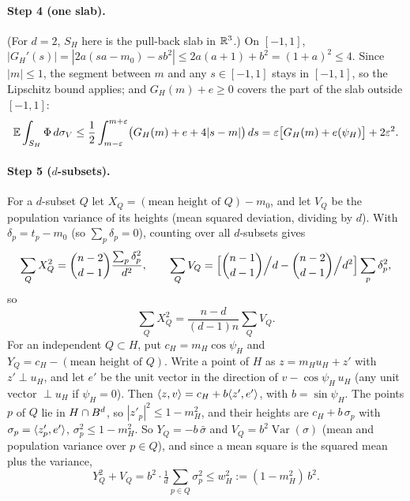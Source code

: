 \documentclass[11pt]{article}
\begin{document}
\paragraph{Step 4 (one slab).} (For $d = 2$, $S_H$ here is the pull-back slab in $\mathbb{R}^3$.) On
$[-1, 1]$,
$|G_H'(s)| = |2a(sa - m_0) - sb^2| \le 2a(a + 1) + b^2 = (1 + a)^2 \le 4$. Since $|m| \le 1$, the
segment between $m$ and any $s \in [-1, 1]$ stays in $[-1, 1]$, so the Lipschitz bound applies; and
$G_H(m) + e \ge 0$ covers the part of the slab outside $[-1, 1]$:
\begin{equation*}
  \mathbb{E} \int_{S_H} \Phi \, d\sigma_V
    \le \frac12 \int_{m-\varepsilon}^{m+\varepsilon} \bigl(G_H(m) + e + 4|s - m|\bigr)\, ds
    = \varepsilon\bigl[G_H(m) + e(\psi_H)\bigr] + 2\varepsilon^2.
\end{equation*}

\paragraph{Step 5 ($d$-subsets).} For a $d$-subset $Q$ let $X_Q = (\text{mean height of } Q) - m_0$, and
let $V_Q$ be the population variance of its heights (mean squared deviation, dividing by $d$).
With $\delta_p = t_p - m_0$ (so $\sum_p \delta_p = 0$), counting over all $d$-subsets gives
\begin{equation*}
  \sum_Q X_Q^2 = \binom{n-2}{d-1} \frac{\sum_p \delta_p^2}{d^2}, \qquad
  \sum_Q V_Q = \Bigl[\binom{n-1}{d-1}\Big/d - \binom{n-2}{d-1}\Big/d^2\Bigr] \sum_p \delta_p^2,
\end{equation*}
so
\begin{equation*}
  \sum_Q X_Q^2 = \frac{n - d}{(d - 1)n} \sum_Q V_Q.
\end{equation*}
For an independent $Q \subset H$, put $c_H = m_H \cos\psi_H$ and
$Y_Q = c_H - (\text{mean height of } Q)$. Write a point of $H$ as $z = m_H u_H + z'$ with
$z' \perp u_H$, and let $e'$ be the unit vector in the direction of $v - \cos\psi_H\, u_H$ (any unit
vector $\perp u_H$ if $\psi_H = 0$). Then $\langle z,v\rangle = c_H + b\langle z',e'\rangle$, with $b = \sin\psi_H$.
The points $p$ of $Q$ lie in $H \cap B^d$, so $|z'_p|^2 \le 1 - m_H^2$, and their heights are
$c_H + b\,\sigma_p$ with $\sigma_p = \langle z'_p,e'\rangle$, $\sigma_p^2 \le 1 - m_H^2$. So $Y_Q = -b\,\bar\sigma$
and $V_Q = b^2 \operatorname{Var}(\sigma)$ (mean and population variance over $p \in Q$), and since a
mean square is the squared mean plus the variance,
\begin{equation*}
  Y_Q^2 + V_Q = b^2 \cdot \tfrac1d \textstyle\sum_{p \in Q} \sigma_p^2 \le w_H^2 := (1 - m_H^2)\, b^2 .
\end{equation*}
\end{document}
